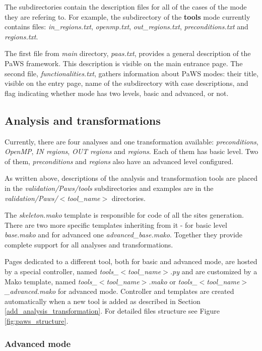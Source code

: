 The subdirectories contain the description files for all of the cases of the mode they are refering to. For example, the subdirectory of the {\bf tools} mode currently contains files: \emph{in\_regions.txt}, \emph{openmp.txt}, \emph{out\_regions.txt}, \emph{preconditions.txt} and \emph{regions.txt}.

The first file from \emph{main} directory, \emph{paas.txt}, provides a general description of the PaWS framework. This description is visible on the main entrance page. The second file, \emph{functionalities.txt}, gathers information about PaWS modes: their title, visible on the entry page, name of the subdirectory with case descriptions, and flag indicating whether mode has two levels, basic and advanced, or not.

\subsection{Analysis and transformations}

Currently, there are four analyses and one transformation available: \emph{preconditions}, \emph{OpenMP}, \emph{IN regions}, \emph{OUT regions} and \emph{regions}. Each of them has basic level. Two of them, \emph{preconditions} and \emph{regions} also have an advanced level configured.

As written above, descriptions of the analysis and transformation tools are placed in the \emph{validation/Paws/tools} subdirectories and examples are in the \emph{validation/Paws/$<$tool\_name$>$} directories.

The \emph{skeleton.mako} template is responsible for code of all the sites generation. There are two more specific templates inheriting from it - for basic level \emph{base.mako} and for advanced one \emph{advanced\_base.mako}. Together they provide complete support for all analyses and transformations.

Pages dedicated to a different tool, both for basic and advanced mode, are hosted by a special controller, named \emph{tools\_$<$tool\_name$>$.py} and are customized by a Mako template, named \emph{tools\_$<$tool\_name$>$.mako} or \emph{tools\_$<$tool\_name$>$\_advanced.mako} for advanced mode. Controller and templates are created automatically when a new tool is added as described in Section \ref{add_analysis_transformation}. For detailed files structure see Figure \ref{fig:paws_structure}.

\subsubsection{Advanced mode}

